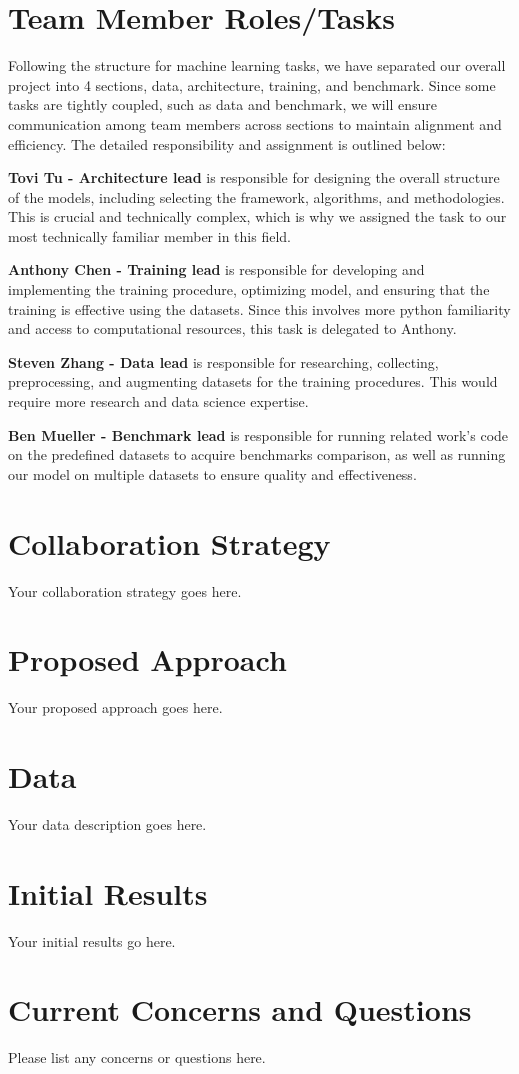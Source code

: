 \documentclass[10pt,twocolumn,letterpaper]{article}
\begin{document}
\section{Team Member Roles/Tasks}
\label{sec:roles}
Following the structure for machine learning tasks, we have separated our overall project into 4 sections, data, architecture, training, and benchmark. Since some tasks are tightly coupled, such as data and benchmark, we will ensure communication among team members across sections to maintain alignment and efficiency. The detailed responsibility and assignment is outlined below:

\textbf{Tovi Tu - Architecture lead} is responsible for designing the overall structure of the models, including selecting the framework, algorithms, and methodologies. This is crucial and technically complex, which is why we assigned the task to our most technically familiar member in this field.


\textbf{Anthony Chen - Training lead} is responsible for developing and implementing the training procedure, optimizing model, and ensuring that the training is effective using the datasets. Since this involves more python familiarity and access to computational resources, this task is delegated to Anthony.


\textbf{Steven Zhang - Data lead} is responsible for researching, collecting, preprocessing, and augmenting datasets for the training procedures. This would require more research and data science expertise. 


\textbf{Ben Mueller - Benchmark lead} is responsible for running related work’s code on the predefined datasets to acquire benchmarks comparison, as well as running our model on multiple datasets to ensure quality and effectiveness. 



\section{Collaboration Strategy}

Your collaboration strategy goes here.

\section{Proposed Approach}

Your proposed approach goes here.

\section{Data}

Your data description goes here.

\section{Initial Results}

Your initial results go here.

\section{Current Concerns and Questions}

Please list any concerns or questions here.

{\small


}
\end{document}
